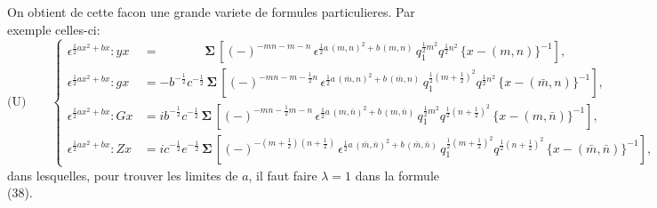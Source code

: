 \documentclass[11pt,a4paper]{article}
\begin{document}
On obtient de cette facon une grande variete de formules particulieres. Par
exemple celles-ci:
\begin{equation*}
\text{(U)}\qquad
\left\{
\begin{aligned}
\epsilon^{\frac{1}{2}ax^2+bx} : yx &= \phantom{-b^{-\frac{1}{2}}c^{-\frac{1}{2}}}\boldsymbol{\Sigma}\, [(-)^{-mn-m-n}\, \epsilon^{\frac{1}{2}a\, (m, n)^2+b\, (m, n)}\, q_1^{\frac{1}{2}m^2} q^{\frac{1}{2}n^2}\, \{x - (m, n)\}^{-1}],\\
\epsilon^{\frac{1}{2}ax^2+bx} : gx &= -b^{-\frac{1}{2}} c^{-\frac{1}{2}}\, \boldsymbol{\Sigma}\, [(-)^{-mn-m-\frac{1}{2}n}\, \epsilon^{\frac{1}{2}a\, (\bar{m}, n)^2+b\, (\bar{m}, n)}\, q_1^{\frac{1}{2}(m+\frac{1}{2})^2} q^{\frac{1}{2}n^2}\, \{x - (\bar{m}, n)\}^{-1}],\\
\epsilon^{\frac{1}{2}ax^2+bx} : Gx &= ib^{-\frac{1}{2}} c^{-\frac{1}{2}}\, \boldsymbol{\Sigma}\, [(-)^{-mn-\frac{1}{2}m-n}\, \epsilon^{\frac{1}{2}a\, (m, \bar{n})^2+b\, (m, \bar{n})}\, q_1^{\frac{1}{2}m^2} q^{\frac{1}{2}(n+\frac{1}{2})^2}\, \{x - (m, \bar{n})\}^{-1}],\\
\epsilon^{\frac{1}{2}ax^2+bx} : Zx &= ic^{-\frac{1}{2}} e^{-\frac{1}{2}}\, \boldsymbol{\Sigma}\, [(-)^{-(m+\frac{1}{2})(n+\frac{1}{2})}\, \epsilon^{\frac{1}{2}a\, (\bar{m}, \bar{n})^2+b\, (\bar{m}, \bar{n})}\, q_1^{\frac{1}{2}(m+\frac{1}{2})^2} q^{\frac{1}{2}(n+\frac{1}{2})^2}\, \{x - (\bar{m}, \bar{n})\}^{-1}],
\end{aligned}
\right.
\end{equation*}
dans lesquelles, pour trouver les limites de $a$, il faut faire $\lambda = 1$ dans la formule (38).
\end{document}
